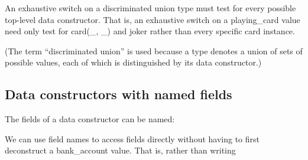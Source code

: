 \documentclass[a4paper,11pt,notitlepage,onecolumn]{book}
\begin{document}
An exhaustive switch on a discriminated union type must test for every
possible top-level data constructor.  That is, an exhaustive switch on a
\textsf{playing\_card} value need only test for \textsf{card(\_, \_)} and \textsf{joker} rather
than every specific \textsf{card} instance.

(The term ``discriminated union'' is used because a type denotes a union of
sets of possible values, each of which is distinguished by its data
constructor.)



\subsection*{Data constructors with named fields}

The fields of a data constructor can be named:
\begin{small}

\begin{ptabular}
\nextline
{}
\nextline
{}
\nextline
\end{ptabular}

\end{small}
We can use field names to access fields directly without having to
first deconstruct a \textsf{bank\_account} value.  That is, rather than writing
\begin{small}

\begin{ptabular}
\nextline
{}
\nextline
{}
\nextline
{}
\nextline
{}
\nextline
{}
\nextline
\end{ptabular}

\end{small}
\end{document}
